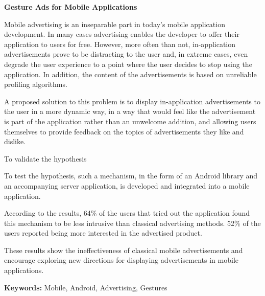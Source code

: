 \begin{abstracts}

\textbf{Gesture Ads for Mobile Applications}

Mobile advertising is an inseparable part in today's mobile application development. In many cases advertising enables the developer to offer their application to users for free. However, more often than not, in-application advertisements prove to be distracting to the user and, in extreme cases, even degrade the user experience to a point where the user decides to stop using the application. In addition, the content of the advertisements is based on unreliable profiling algorithms.

A proposed solution to this problem is to display in-application advertisements to the user in a more dynamic way, in a way that would feel like the advertisement is part of the application rather than an unwelcome addition, and allowing users themselves to provide feedback on the topics of advertisements they like and dislike.

To validate the hypothesis

To test the hypothesis, such a mechanism, in the form of an Android library and an accompanying server application, is developed and integrated into a mobile application.

According to the results, 64\% of the users that tried out the application found this mechanism to be less intrusive than classical advertising methods. 52\% of the users reported being more interested in the advertised product.

These results show the ineffectiveness of classical mobile advertisements and encourage exploring new directions for displaying advertisements in mobile applications.

\bigskip

\textbf{Keywords:} Mobile, Android, Advertising, Gestures

\end{abstracts}